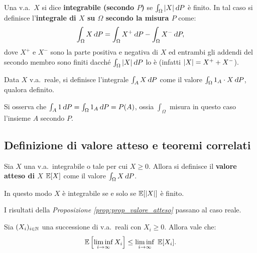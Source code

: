 \begin{multicols*}{2}
\begin{definition}
    Una v.a.~$X$ si dice \textbf{integrabile (secondo $P$)} se
    $\int_\Omega \abs{X} \dP$ è finito. In tal caso si definisce
    l'\textbf{integrale di $X$ su $\Omega$ secondo la misura $P$} come:
    \[
        \int_\Omega X \dP = \int_\Omega X^+ \dP - \int_\Omega X^- \dP,
    \]
    dove $X^+$ e $X^-$ sono la parte positiva e negativa di $X$ ed
    entrambi gli addendi del secondo membro sono finiti dacché
    $\int_\Omega \abs{X} \dP$ lo è (infatti $\left\lvert X \right\rvert = X^+ + X^-$).
\end{definition}

\begin{definition}
    Data $X$ v.a.~reale, si definisce l'integrale $\int_A X \dP$ come il valore
    $\int_\Omega 1_A \cdot X \dP$, qualora definito.
\end{definition}

\begin{remark}
    Si osserva che $\int_A 1 \dP = \int_\Omega 1_A \dP = P(A)$, ossia
    $\int_\Omega$ misura in questo caso l'insieme $A$ secondo $P$.
\end{remark}

\subsection{Definizione di valore atteso e teoremi correlati}

\begin{definition}
    Sia $X$ una v.a.~integrabile o tale per cui $X \geq 0$.
    Allora si definisce il \textbf{valore
    atteso di $X$} $\mathbb{E}[X]$ come il valore $\int_\Omega X \dP$.
\end{definition}

\begin{remark}
    In questo modo $X$ è integrabile se e solo se $\mathbb{E}[\left\lvert X \right\rvert]$ è finito.
\end{remark}

\begin{proposition}
    I risultati della \textit{Proposizione \ref{prop:prop_valore_atteso}} passano
    al caso reale.
\end{proposition}

\begin{lemma}[di Fatou]
    Sia $(X_i)_{i \in \mathbb{N}}$ una successione di v.a.~reali con $X_i \geq 0$. Allora vale che:
    \[
        \mathbb{E}\left[\liminf_{i \to \infty} X_i\right] \leq \liminf_{i \to \infty} \; \mathbb{E}[X_i].
    \]


\end{lemma}
\end{multicols*}
